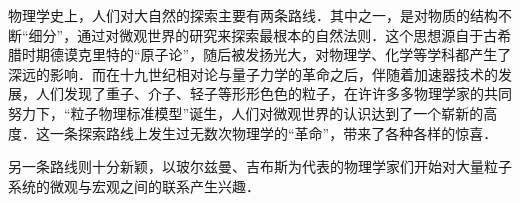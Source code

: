 
物理学史上，人们对大自然的探索主要有两条路线．其中之一，是对物质的结构不断“细分”，通过对微观世界的研究来探索最根本的自然法则．这个思想源自于古希腊时期德谟克里特的“原子论”，随后被发扬光大，对物理学、化学等学科都产生了深远的影响．而在十九世纪相对论与量子力学的革命之后，伴随着加速器技术的发展，人们发现了重子、介子、轻子等形形色色的粒子，在许许多多物理学家的共同努力下，“粒子物理标准模型”诞生，人们对微观世界的认识达到了一个崭新的高度．这一条探索路线上发生过无数次物理学的“革命”，带来了各种各样的惊喜．

另一条路线则十分新颖，以玻尔兹曼、吉布斯为代表的物理学家们开始对大量粒子系统的微观与宏观之间的联系产生兴趣．